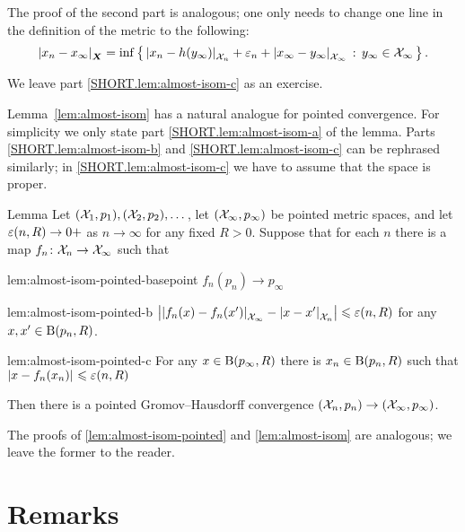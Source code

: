 The proof of the second part is analogous; one only needs to change one line in the definition of the metric to the following:
\[|{x_n}-{x_\infty}|_{\bm{X}}^{{}}=\inf\left\{\,{|{x_n}-{h(y_\infty)}|_{\mathcal{X}_n}^{{}}+\varepsilon_n+|{x_\infty}-{y_\infty}|_{\mathcal{X}_\infty}^{{}}}\,:\,{{y_\infty}\in \mathcal{X}_\infty}\,\right\}.\]

We leave part \ref{SHORT.lem:almost-isom-c} as an exercise.
\qedsf

Lemma~\ref{lem:almost-isom} has a natural analogue for pointed convergence.
For simplicity we only state part \ref{SHORT.lem:almost-isom-a} of the lemma.
Parts \ref{SHORT.lem:almost-isom-b} and \ref{SHORT.lem:almost-isom-c} can be rephrased similarly;
in \ref{SHORT.lem:almost-isom-c} we have to assume that the space is proper.



\begin{thm}{Lemma}\label{lem:almost-isom-pointed}
Let $(\mathcal{X}_1, p_1),(\mathcal{X}_2,p_2) ,\dots$, let $(\mathcal{X}_\infty, p_\infty)$ be pointed metric spaces, and let $\varepsilon(n,R)\to0+$ as $n\to\infty$ for any fixed $R>0$.
Suppose that for each $n$ there is a map $f_n\colon\mathcal{X}_n\to\mathcal{X}_\infty$ such that


\begin{subthm}{lem:almost-isom-pointed-basepoint}
$f_n(p_n)\to p_\infty$
\end{subthm}

\begin{subthm}{lem:almost-isom-pointed-b}
$\bigl||{f_n(x)}-{f_n(x')}|_{\mathcal{X}_\infty }^{{}}-|{x}-{x'}|_{\mathcal{X}_n}^{{}}\bigr|\leqslant \varepsilon(n,R)$ for any $x,x'\in \mathrm{B}{}(p_n,R)$.
\end{subthm}

\begin{subthm}{lem:almost-isom-pointed-c}
For any $x \in \mathrm{B}{}(p_\infty,R)$ there is $x_n\in \mathrm{B}{}(p_n,R)$ such that $|{x}-{f_n(x_n)}|_{}^{{}}\leqslant \varepsilon(n,R)$
\end{subthm}

Then there is a pointed  Gromov--Hausdorff convergence $(\mathcal{X}_n,p_n)\to (\mathcal{X}_\infty,p_\infty)$.
\end{thm}

The proofs of \ref{lem:almost-isom-pointed} and \ref{lem:almost-isom} are analogous;
we leave the former to the reader.



\section{Remarks}

